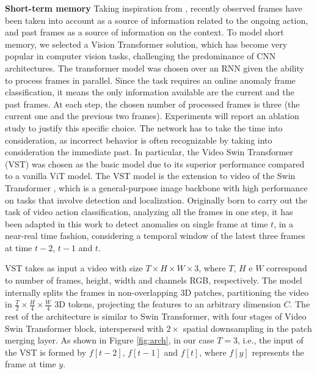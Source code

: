 \noindent\textbf{Short-term memory}
Taking inspiration from \cite{xu2021long}, recently observed frames have been taken into account as a source of information related to the ongoing action, and past frames as a source of information on the context.
To model short memory, we selected a Vision Transformer \cite{DBLP:conf/iclr/DosovitskiyB0WZ21} solution, which has become very popular in computer vision tasks, challenging the predominance of CNN architectures. The transformer model was chosen over an RNN given the ability to process frames in parallel.
Since the task requires an online anomaly frame classification, it means the only information available are the current and the past frames.
At each step, the chosen number of processed frames is three (the current one and the previous two frames). Experiments will report an ablation study to justify this specific choice.
The network has to take the time into consideration, as incorrect behavior is often recognizable by taking into consideration the immediate past. 
In particular, the Video Swin Transformer (VST) \cite{liu_video_2022} was chosen as the basic model due to its superior performance compared to a vanilla ViT \cite{DBLP:conf/iclr/DosovitskiyB0WZ21} model.
The VST model is the extension to video of the Swin Transformer \cite{liu2021Swin}, which is a general-purpose image backbone with high performance on tasks that involve detection and localization.
Originally born to carry out the task of video action classification, analyzing all the frames in one step, it has been adapted in this work to detect anomalies on single frame at time $t$, in a near-real time fashion, considering a temporal window of the latest three frames at time $t-2$, $t-1$ and $t$.

VST takes as input a video with size $T \times H \times W \times 3$, where $T$, $H$ e $W$ correspond to number of frames, height, width and channels RGB, respectively.
The model internally splits the frames in non-overlapping 3D patches, partitioning the video in $\frac{T}{2} \times \frac{H}{4} \times \frac{W}{4}$ 3D tokens, projecting the features to an arbitrary dimension $C$.
The rest of the architecture is similar to Swin Transformer, with four stages of Video Swin Transformer block, interspersed with $2\times$ spatial downsampling in the patch merging layer.
As shown in Figure \ref{fig:arch}, in our case $T=3$, i.e., the input of the VST is formed by $f[t-2]$, $f[t-1]$ and $f[t]$, where $f[y]$ represents the frame at time $y$.

